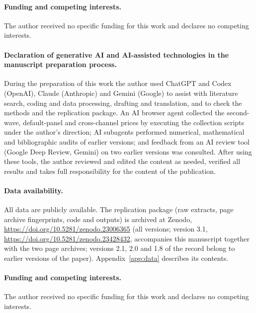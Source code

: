 \documentclass[11pt]{article}
\theoremstyle{definition}
\theoremstyle{remark}
\begin{document}
\paragraph{Funding and competing interests.} The author received no specific funding for this work and declares no competing interests.
\else
\paragraph{Declaration of generative AI and AI-assisted technologies in the manuscript preparation process.} During the preparation of this work the author used ChatGPT and Codex (OpenAI), Claude (Anthropic) and Gemini (Google) to assist with literature search, coding and data processing, drafting and translation, and to check the methods and the replication package. An AI browser agent collected the second-wave, default-panel and cross-channel prices by executing the collection scripts under the author's direction; AI subagents performed numerical, mathematical and bibliographic audits of earlier versions; and feedback from an AI review tool (Google Deep Review, Gemini) on two earlier versions was consulted. After using these tools, the author reviewed and edited the content as needed, verified all results and takes full responsibility for the content of the publication.
\paragraph{Data availability.} All data are publicly available. The replication package (raw extracts, page archive fingerprints, code and outputs) is archived at Zenodo, \href{https://doi.org/10.5281/zenodo.23006365}{https://doi.org/10.5281/zenodo.23006365} (all versions; version 3.1, \href{https://doi.org/10.5281/zenodo.23428432}{https://doi.org/10.5281/zenodo.23428432}, accompanies this manuscript together with the two page archives; versions 2.1, 2.0 and 1.8 of the record belong to earlier versions of the paper). Appendix~\ref{app:data} describes its contents.
\paragraph{Funding and competing interests.} The author received no specific funding for this work and declares no competing interests.
\fi



\appendix
\end{document}
